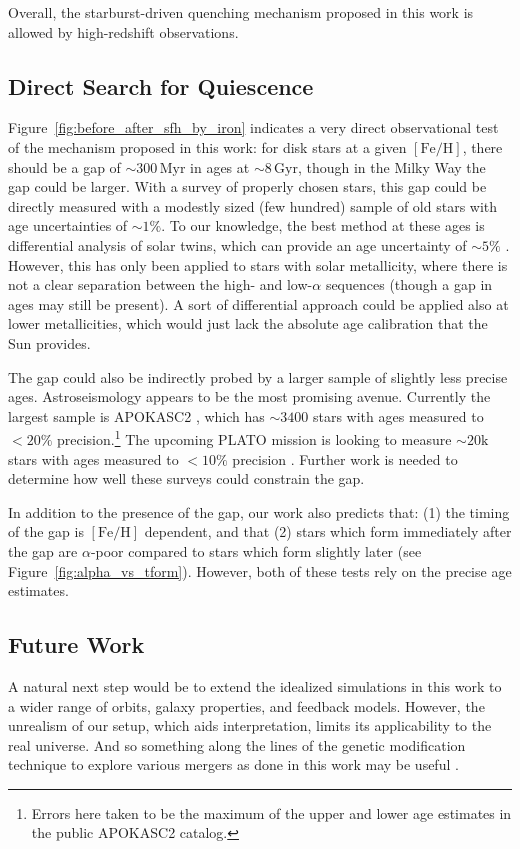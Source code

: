 \documentclass[linenumbers, twocolumn]{aastex631}
\newcommand{\Gyr}{\ensuremath{\textrm{Gyr}}}
\newcommand{\Myr}{\ensuremath{\textrm{Myr}}}
\newcommand{\FeH}{\ensuremath{[\textrm{Fe}/\textrm{H}]}}
\begin{document}
Overall, the starburst-driven quenching mechanism proposed in this work is allowed by high-redshift observations.

\subsection{Direct Search for Quiescence}\label{ssec:obsqui}
Figure~\ref{fig:before_after_sfh_by_iron} indicates a very direct observational test of the mechanism proposed in this work: for disk stars at a given \FeH{}, there should be a gap of $\sim300\,\Myr$ in ages at $\sim8\,\Gyr$, though in the Milky Way the gap could be larger. With a survey of properly chosen stars, this gap could be directly measured with a modestly sized (few hundred) sample of old stars with age uncertainties of $\sim1\%$. To our knowledge, the best method at these ages is differential analysis of solar twins, which can provide an age uncertainty of $\sim5\%$ \citep[e.g.][]{2014ApJ...795...23B,2018MNRAS.474.2580S}. However, this has only been applied to stars with solar metallicity, where there is not a clear separation between the high- and low-$\alpha$ sequences (though a gap in ages may still be present). A sort of differential approach could be applied also at lower metallicities, which would just lack the absolute age calibration that the Sun provides.

The gap could also be indirectly probed by a larger sample of slightly less precise ages. Astroseismology appears to be the most promising avenue. Currently the largest sample is APOKASC2 \citep{2018ApJS..239...32P}, which has $\sim3400$ stars with ages measured to $<20\%$ precision.\footnote{Errors here taken to be the maximum of the upper and lower age estimates in the public APOKASC2 catalog.} The upcoming PLATO mission is looking to measure $\sim20\textrm{k}$ stars with ages measured to $<10\%$ precision \citep{2024arXiv240605447R}. Further work is needed to determine how well these surveys could constrain the gap.

In addition to the presence of the gap, our work also predicts that: (1) the timing of the gap is \FeH{} dependent, and that (2) stars which form immediately after the gap are $\alpha$-poor compared to stars which form slightly later (see Figure~\ref{fig:alpha_vs_tform}). However, both of these tests rely on the precise age estimates.

\subsection{Future Work}
A natural next step would be to extend the idealized simulations in this work to a wider range of orbits, galaxy properties, and feedback models. However, the unrealism of our setup, which aids interpretation, limits its applicability to the real universe. And so something along the lines of the genetic modification technique to explore various mergers as done in this work may be useful \citep{2016MNRAS.455..974R,2017MNRAS.465..547P}.
\end{document}
